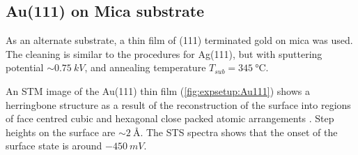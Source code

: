 \subsection*{Au(111) on Mica substrate}

As an alternate substrate, a thin film of (111) terminated gold on mica was used. The cleaning is similar to the procedures for Ag(111), but with sputtering potential $\sim \SI{0.75}{kV}$, and annealing temperature $T_{sub} = \SI{345}{\celsius}$.

An \ac{STM} image of the Au(111) thin film (\autoref{fig:expsetup:Au111}) shows a herringbone structure as a result of the reconstruction of the surface into regions of face centred cubic and hexagonal close packed atomic arrangements \citep{barth1990scanning}. Step heights on the surface are $\sim \SI{2}{\angstrom}$. The \ac{STS} spectra shows that the onset of the surface state is around $\SI{-450}{mV}$.

